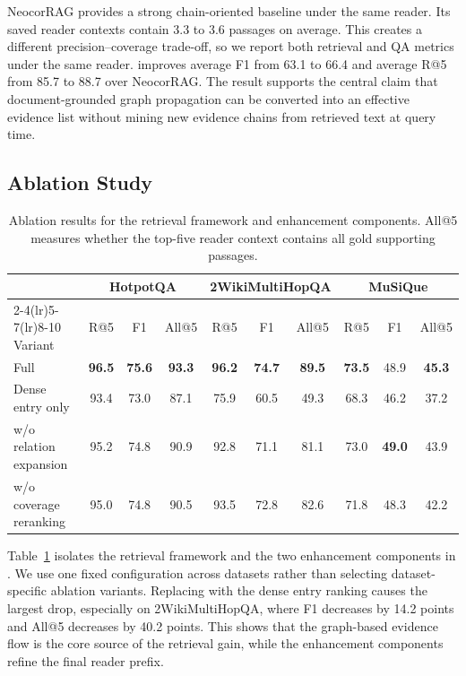 NeocorRAG provides a strong chain-oriented baseline under the same reader.
Its saved reader contexts contain 3.3 to 3.6 passages on average. This
creates a different precision--coverage trade-off, so we report both
retrieval and QA metrics under the same reader. \methodname{} improves
average F1 from 63.1 to 66.4 and average R@5 from 85.7 to 88.7 over
NeocorRAG. The result supports the central claim that document-grounded
graph propagation can be converted into an effective evidence list
without mining new evidence chains from retrieved text at query time.

\subsection{Ablation Study}
\label{sec:experiments:ablation}

\begin{table}[t]
\centering
\small
\begin{tabular}{lccc ccc ccc}
\toprule
& \multicolumn{3}{c}{HotpotQA} &
\multicolumn{3}{c}{2WikiMultiHopQA} &
\multicolumn{3}{c}{MuSiQue} \\
\cmidrule(lr){2-4}\cmidrule(lr){5-7}\cmidrule(lr){8-10}
Variant & R@5 & F1 & All@5 & R@5 & F1 & All@5 & R@5 & F1 & All@5 \\
\midrule
Full \methodname{} & \textbf{96.5} & \textbf{75.6} & \textbf{93.3}
& \textbf{96.2} & \textbf{74.7} & \textbf{89.5}
& \textbf{73.5} & 48.9 & \textbf{45.3} \\
Dense entry only & 93.4 & 73.0 & 87.1
& 75.9 & 60.5 & 49.3
& 68.3 & 46.2 & 37.2 \\
w/o relation expansion & 95.2 & 74.8 & 90.9
& 92.8 & 71.1 & 81.1
& 73.0 & \textbf{49.0} & 43.9 \\
w/o coverage reranking & 95.0 & 74.8 & 90.5
& 93.5 & 72.8 & 82.6
& 71.8 & 48.3 & 42.2 \\
\bottomrule
\end{tabular}
\caption{Ablation results for the retrieval framework and enhancement components.
All@5 measures whether the top-five reader context contains all gold
supporting passages.}
\label{tab:ablation}
\end{table}

Table~\ref{tab:ablation} isolates the retrieval framework and the two
enhancement components in \methodname{}. We use one fixed configuration
across datasets rather than selecting dataset-specific ablation variants.
Replacing
\methodname{} with the dense entry ranking causes the largest drop,
especially on 2WikiMultiHopQA, where F1 decreases by 14.2 points and
All@5 decreases by 40.2 points. This shows that the graph-based evidence
flow is the core source of the retrieval gain, while the enhancement
components refine the final reader prefix.

